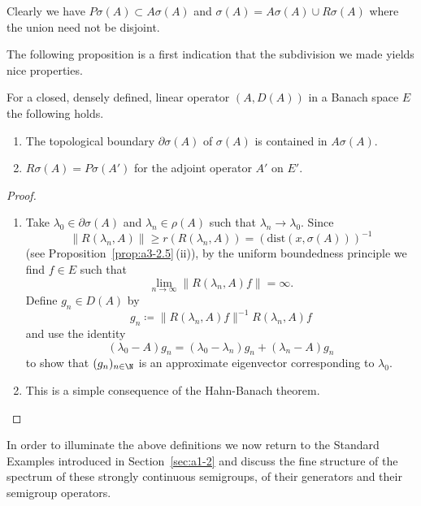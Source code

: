Clearly we have $P\sigma(A) \subset A\sigma(A)$ and $\sigma(A) = A\sigma(A) \cup R\sigma(A)$ where the union need not be disjoint.

The following proposition is a first indication that the subdivision we made yields nice properties.
\begin{proposition}\label{prop:a3-2.2}
For a closed, densely defined, linear operator $(A,D(A))$ in a Banach space $E$ the following holds.
\begin{enumerate}[\upshape (i)]

\item
The topological boundary $\partial\sigma(A)$ of\/ $\sigma(A)$ is contained in $A\sigma(A)$.

\item
{}
$R\sigma(A) = P\sigma(A')$ for the adjoint operator $A'$ on $E'$.

\end{enumerate}
\end{proposition}
\begin{proof}
\begin{enumerate}[\upshape (i), wide, labelindent=.25em]

\item 
Take $\lambda_{0} \in \partial\sigma(A)$ and $\lambda_{n} \in \rho(A)$ such that $\lambda_{n} \to \lambda_{0}$.
Since 
%
\[
	 \|R(\lambda_{n},A)\| \geq r(R(\lambda_{n},A)) = (\text{dist}(x,\sigma(A)))^{-1} 
\]
%
(see Proposition~\ref{prop:a3-2.5}\,(ii)), by the uniform boundedness principle we find $f \in E$ such that
\[
	\lim_{n \to \infty}\|R(\lambda_n ,A)f\| = \infty .
\]
Define $g_{n} \in D(A)$ by
\[
g_{n} \coloneqq \|R(\lambda_{n},A)f\|^{-1} R(\lambda_{n},A)f
\]
and use the identity
\[
	(\lambda_{0} - A)g_{n} = (\lambda_{0} - \lambda_{n})g_{n} + (\lambda_{n} - A)g_{n}
\]
to show that $(g_{n})_{n \in \N}$ is an approximate eigenvector corresponding to $\lambda_{0}$.

\item 
This is a simple consequence of the Hahn-Banach theorem.
\qedhere
\end{enumerate}
\end{proof}
In order to illuminate the above definitions we now return to the Standard Examples introduced in Section~\ref{sec:a1-2} and discuss the fine structure of the spectrum of these strongly continuous semigroups, \ie of their generators and their semigroup operators.
